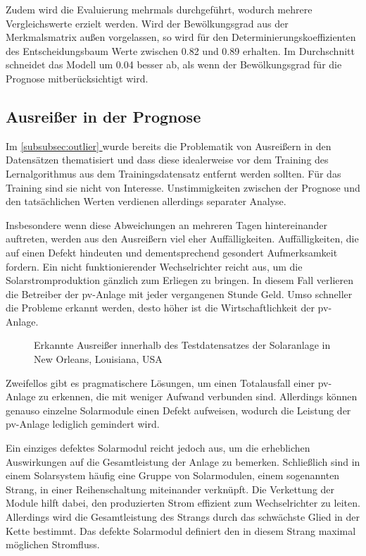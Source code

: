 \documentclass[12pt, a4paper]{article}
\newcommand*{\fullref}[1]{\hyperref[{#1}]{\autoref*{#1} \textit{\nameref*{#1}}}}
\begin{document}
Zudem wird die Evaluierung mehrmals durchgeführt, wodurch mehrere Vergleichswerte erzielt werden. Wird der Bewölkungsgrad aus der Merkmalsmatrix außen vorgelassen, so wird für den Determinierungskoeffizienten des Entscheidungsbaum Werte zwischen 0.82 und 0.89 erhalten. Im Durchschnitt schneidet das Modell um 0.04 besser ab, als wenn der Bewölkungsgrad für die Prognose mitberücksichtigt wird. 

\subsection{Ausreißer in der Prognose}

Im \fullref{subsubsec:outlier} wurde bereits die Problematik von Ausreißern in den Datensätzen thematisiert und dass diese idealerweise vor dem Training des Lernalgorithmus aus dem Trainingsdatensatz entfernt werden sollten. Für das Training sind sie nicht von Interesse. Unstimmigkeiten zwischen der Prognose und den tatsächlichen Werten verdienen allerdings separater Analyse.

Insbesondere wenn diese Abweichungen an mehreren Tagen hintereinander auftreten, werden aus den Ausreißern viel eher Auffälligkeiten. Auffälligkeiten, die auf einen Defekt hindeuten und dementsprechend gesondert Aufmerksamkeit fordern. Ein nicht funktionierender Wechselrichter reicht aus, um die Solarstromproduktion gänzlich zum Erliegen zu bringen. In diesem Fall verlieren die Betreiber der \ac{pv}-Anlage mit jeder vergangenen Stunde Geld. Umso schneller die Probleme erkannt werden, desto höher ist die Wirtschaftlichkeit der \ac{pv}-Anlage.

\begin{figure}[h]
\centering
\def\svgwidth{400pt}

\caption{Erkannte Ausreißer innerhalb des Testdatensatzes der Solaranlage in New Orleans, Louisiana, USA}
\label{fig:predictions_outlier_xxxx}
\end{figure}

Zweifellos gibt es pragmatischere Lösungen, um einen Totalausfall einer \ac{pv}-Anlage zu erkennen, die mit weniger Aufwand verbunden sind. Allerdings können genauso einzelne Solarmodule einen Defekt aufweisen, wodurch die Leistung der \ac{pv}-Anlage lediglich gemindert wird. 

Ein einziges defektes Solarmodul reicht jedoch aus, um die erheblichen Auswirkungen auf die Gesamtleistung der Anlage zu bemerken. Schließlich sind in einem Solarsystem häufig eine Gruppe von Solarmodulen, einem sogenannten Strang, in einer Reihenschaltung miteinander verknüpft. Die Verkettung der Module hilft dabei, den produzierten Strom effizient zum Wechselrichter zu leiten. Allerdings wird die Gesamtleistung des Strangs durch das schwächste Glied in der Kette bestimmt. Das defekte Solarmodul definiert den in diesem Strang maximal möglichen Stromfluss.
\end{document}
